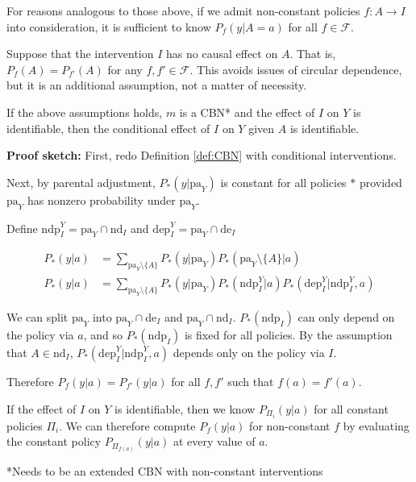 For reasons analogous to those above, if we admit non-constant policies $f:A\to I$ into consideration, it is sufficient to know $P_{f}(y|A=a)$ for all $f\in\mathcal{F}$.

Suppose that the intervention $I$ has no causal effect on $A$. That is, $P_f (A) = P_{f'}(A)$ for any $f,f'\in\mathcal{F}$. This avoids issues of circular dependence, but it is an additional assumption, not a matter of necessity.

If the above assumptions holds, $m$ is a CBN* and the effect of $I$ on $Y$ is identifiable, then the conditional effect of $I$ on $Y$ given $A$ is identifiable.

\textbf{Proof sketch:} First, redo Definition \ref{def:CBN} with conditional interventions.

Next, by parental adjustment, $P_*(y|\mathrm{pa}_Y)$ is constant for all policies $*$ provided $\mathrm{pa}_Y$ has nonzero probability under $\mathrm{pa}_Y$.  

Define $\mathrm{ndp}^Y_I = \mathrm{pa}_Y\cap \mathrm{nd}_I$ and $\mathrm{dep}^Y_I=\mathrm{pa}_Y\cap \mathrm{de}_I$

\begin{align}
    P_*(y|a) &= \sum_{\mathrm{pa}_Y\setminus \{A\}} P_*(y|\mathrm{pa}_Y) P_*(\mathrm{pa}_Y\setminus\{A\}|a) \\
    P_*(y|a) &= \sum_{\mathrm{pa}_Y\setminus \{A\}} P_*(y|\mathrm{pa}_Y) P_*(\mathrm{ndp}^Y_I|a) P_*(\mathrm{dep}^Y_I|\mathrm{ndp}^Y_I,a)
\end{align}

We can split $\mathrm{pa}_Y$ into $\mathrm{pa}_Y\cap \mathrm{de}_I$ and $\mathrm{pa}_Y\cap \mathrm{nd}_I$. $P_*(\mathrm{ndp}_I)$ can only depend on the policy via $a$, and so $P_*(\mathrm{ndp}_I)$ is fixed for all policies. By the assumption that $A\in\mathrm{nd}_I$,  $P_*(\mathrm{dep}^Y_I|\mathrm{ndp}^Y_I,a)$ depends only on the policy via $I$.

Therefore $P_f(y|a)=P_{f'}(y|a)$ for all $f,f'$ such that $f(a)=f'(a)$.

If the effect of $I$ on $Y$ is identifiable, then we know $P_{\Pi_i}(y|a)$ for all constant policies $\Pi_i$. We can therefore compute $P_f(y|a)$ for non-constant $f$ by evaluating the constant policy $P_{\Pi_{f(a)}}(y|a)$ at every value of $a$.

*Needs to be an extended CBN with non-constant interventions


